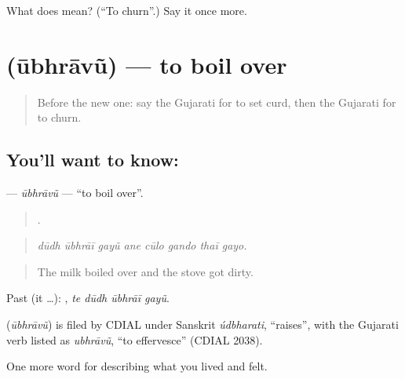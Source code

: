\begin{tcolorbox}[breakable,colback=teal!4,colframe=teal!35!black,title={Before you move on}]
What does  mean? (\textquotedblleft{}To churn\textquotedblright{}.) Say it once more.
\end{tcolorbox}
\section[\texorpdfstring{\gu{ઊભરાવું} (ūbhrāvũ)}{ઊભરાવું (ūbhrāvũ)}]{ (ūbhrāvũ) — to boil over}

\label{lesson:GU-C521-ubhravu}



\begin{quote}
Before the new one: say the Gujarati for to set curd, then the Gujarati for to churn.
\end{quote}

\subsection*{You'll want to know: }
\textbf{} — \emph{ūbhrāvũ} — \textquotedblleft{}to boil over\textquotedblright{}.

\begin{quote}
       .
\end{quote}

\begin{quote}
\emph{dūdh ūbhrāī gayũ ane cūlo gando thaī gayo.}
\end{quote}

\begin{quote}
The milk boiled over and the stove got dirty.
\end{quote}

Past (it …):    , \emph{te dūdh ūbhrāī gayũ}.

\begin{cousinweb}
\textbf{} (\emph{ūbhrāvũ}) is filed by CDIAL under Sanskrit \emph{údbharati}, \textquotedblleft{}raises\textquotedblright{}, with the Gujarati verb listed as \emph{ubhrāvũ}, \textquotedblleft{}to effervesce\textquotedblright{} (CDIAL 2038).
\end{cousinweb}

\begin{grammarlens}[title={What you've built}]
One more word for describing what you lived and felt.
\end{grammarlens}

